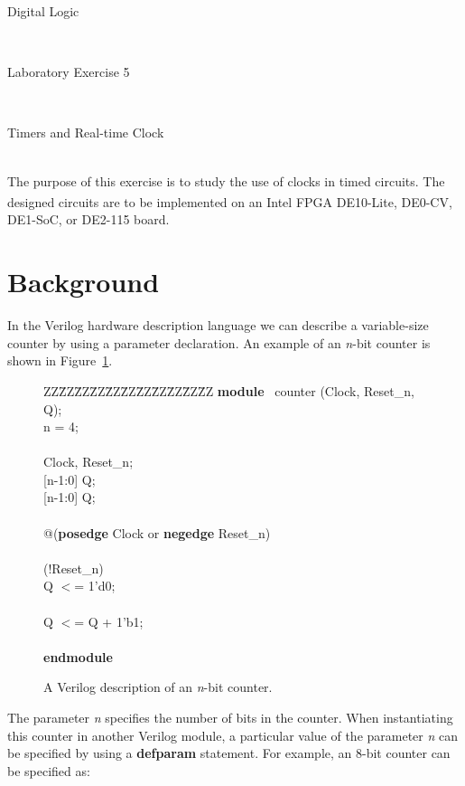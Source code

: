 \documentclass[epsfig,10pt,fullpage]{article}
\newcommand{\LabNum}{5}
\begin{document}
\centerline{\huge Digital Logic}
~\\
\centerline{\huge Laboratory Exercise \LabNum}
~\\
\centerline{\large Timers and Real-time Clock}
~\\

The purpose of this exercise is to study the use of clocks in timed circuits. The designed
circuits are to be implemented on an Intel\textsuperscript{\textregistered} FPGA DE10-Lite, DE0-CV, DE1-SoC, or DE2-115 board.

\section*{Background}
In the Verilog hardware description language we can describe a variable-size counter by 
using a parameter declaration. An example of an {\it n}-bit counter is shown in 
Figure~\ref{fig:n_counter}.

\begin{figure}[H]
\begin{center}
\begin{minipage}[t]{12.5 cm}
\begin{tabbing}
ZZ\=ZZ\=ZZ\=ZZ\=ZZ\=ZZ\=ZZ\=ZZ\=ZZ\=ZZ\=ZZ\kill
{\bf module} ~counter (Clock, Reset\_n, Q);\\
 n = 4;\\
~\\
  Clock, Reset\_n;\\
 [n-1:0] Q;\\
    [n-1:0] Q;\\
~\\
 @({\bf posedge} Clock or {\bf negedge} Reset\_n)\\
\\
\> (!Reset\_n)\\
\>\>\>Q $<$= 1'd0;\\
\>\\
\>\>\>Q $<$= Q + 1'b1;\\
\\
{\bf endmodule}
\end{tabbing}
\end{minipage}
\end{center}
\caption{A Verilog description of an {\it n}-bit counter.}
\label{fig:n_counter}
\end{figure}

The parameter {\it n} specifies the number of bits in the counter. When instantiating this
counter in another Verilog module, a particular value of the parameter {\it n} can be
specified by using a {\bf defparam} statement. For example, an 8-bit counter can be specified as:
\end{document}
